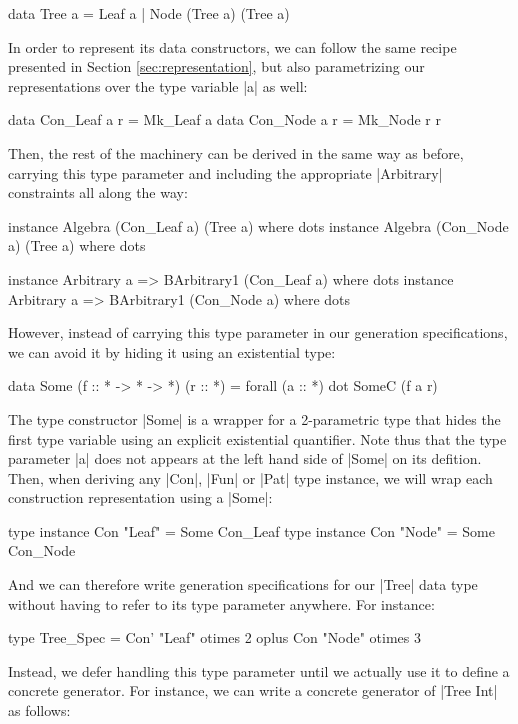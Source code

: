 \begin{code}
data Tree a = Leaf a | Node (Tree a) (Tree a)
\end{code}

In order to represent its data constructors, we can follow the same recipe
presented in Section \ref{sec:representation}, but also parametrizing our
representations over the type variable |a| as well:

\begin{code}
data Con_Leaf a r = Mk_Leaf a
data Con_Node a r = Mk_Node r r
\end{code}

Then, the rest of the machinery can be derived in the same way as before,
carrying this type parameter and including the appropriate |Arbitrary|
constraints all along the way:

\begin{code}
instance Algebra (Con_Leaf a) (Tree a) where dots
instance Algebra (Con_Node a) (Tree a) where dots

instance Arbitrary a => BArbitrary1 (Con_Leaf a) where dots
instance Arbitrary a => BArbitrary1 (Con_Node a) where dots
\end{code}

%
However, instead of carrying this type parameter in our generation
specifications, we can avoid it by hiding it using an existential type:

\begin{code}
data Some (f :: * -> * -> *) (r :: *) = forall (a :: *) dot SomeC (f a r)
\end{code}
%
The type constructor |Some| is a wrapper for a 2-parametric type that hides the
first type variable using an explicit existential quantifier.
%
Note thus that the type parameter |a| does not appears at the left hand side of
|Some| on its defition.
%
Then, when deriving any |Con|, |Fun| or |Pat| type instance, we will wrap each
construction representation using a |Some|:

\begin{code}
type instance Con "Leaf" = Some Con_Leaf
type instance Con "Node" = Some Con_Node
\end{code}

And we can therefore write generation specifications for our |Tree| data type
without having to refer to its type parameter anywhere.
%
For instance:

\begin{code}
type Tree_Spec  =      Con'  "Leaf"  otimes 2
                oplus  Con   "Node"  otimes 3
\end{code}
%
Instead, we defer handling this type parameter until we actually use it to
define a concrete generator.
%
For instance, we can write a concrete generator of |Tree Int| as follows:

